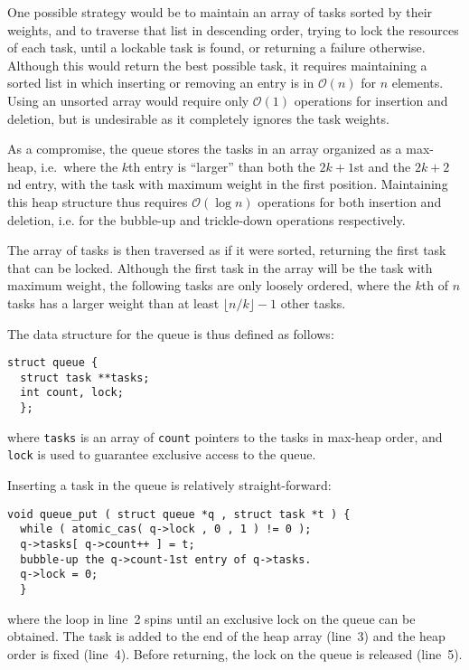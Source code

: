 \documentclass[preprint]{elsarticle}
\newcommand{\oh}[1]
    {\mbox{$ {\mathcal O}( #1 ) $}}
\begin{document}
One possible strategy would be to maintain an array of tasks
sorted by their weights, and to traverse that list in descending
order, trying to lock the resources of each task, until
a lockable task is found, or returning a failure otherwise.
Although this would return the best possible task, it
requires maintaining a sorted list in which inserting
or removing an entry is in \oh{n} for $n$ elements.
Using an unsorted array would require only \oh{1} operations for
insertion and deletion, but is undesirable as it completely
ignores the task weights.

As a compromise, the queue stores the tasks in an array
organized as a max-heap, i.e.~where the $k$th entry is ``larger''
than both the $2k+1$st and the $2k+2$nd entry,
with the task with maximum weight
in the first position.
Maintaining this heap structure thus requires \oh{\log n}
operations for both insertion and deletion, i.e. for the
bubble-up and trickle-down operations respectively.

The array of tasks is then traversed as if it were sorted,
returning the first task that can be locked.
Although the first task in the array will be the task with
maximum weight, the following tasks are only loosely ordered,
where the $k$th of $n$ tasks has a larger weight than at least
$\lfloor n/k\rfloor -1$ other tasks.

The data structure for the queue is thus defined as follows:
\begin{center}\begin{minipage}{0.9\textwidth}
    \begin{lstlisting}
struct queue {
  struct task **tasks;
  int count, lock;
  };
    \end{lstlisting}
\end{minipage}\end{center}
\noindent where {\tt tasks} is an array of {\tt count} pointers
to the tasks in max-heap order, and {\tt lock} is used to
guarantee exclusive access to the queue.

Inserting a task in the queue is relatively straight-forward:
\begin{center}\begin{minipage}{0.9\textwidth}
    \begin{lstlisting}
void queue_put ( struct queue *q , struct task *t ) {
  while ( atomic_cas( q->lock , 0 , 1 ) != 0 );
  q->tasks[ q->count++ ] = t;
  bubble-up the q->count-1st entry of q->tasks.
  q->lock = 0;
  }
    \end{lstlisting}
\end{minipage}\end{center}
\noindent where the loop in line~2 spins until an exclusive
lock on the queue can be obtained.
The task is added to the end of the heap array (line~3)
and the heap order is fixed (line~4).
Before returning, the lock on the queue is released (line~5).
\end{document}

